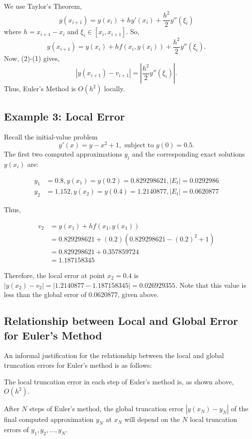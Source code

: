 \documentclass [titlepage,12pt,letter] {article}
\begin{document}
We use Taylor's Theorem,
\[
y(x_{i+1})=y(x_i)+hy'(x_i)+\frac{h^2}{2}y''(\xi_i)
\]
where $h=x_{i+1}-x_i$ and $\xi_i \in [x_i,x_{i+1}]$. So,
\begin{equation}
y(x_{i+1})=y(x_i)+hf(x_i,y(x_i))+\frac{h^2}{2}y''(\xi_i).
\end{equation}
Now, (2)-(1) gives,
\[
|y(x_{i+1})-v_{i+1}|=\left |\frac{h^2}{2}y''(\xi_i) \right |.
\]
Thus, Euler's Method is $O(h^2)$ locally.

\subsection{Example 3: Local Error}

Recall the initial-value problem
\[
y'(x)=y-x^2+1, \text{ subject to } y(0)=0.5.
\]
The first two computed approximations $y_i$ and the corresponding exact solutions $y(x_i)$ are:

\begin{align*}
y_1&=0.8, y(x_1)=y(0.2)=0.829298621, |E_t|=0.0292986 \\
y_2&=1.152, y(x_2)=y(0.4)=1.2140877, |E_t|=0.0620877
\end{align*}

Thus,

\begin{align*}
v_2&=y(x_1)+hf(x_1,y(x_1)) \\
&=0.829298621+(0.2)(0.829298621-(0.2)^2+1) \\
&=0.829298621+0.357859724 \\
&=1.187158345
\end{align*}

Therefore, the local error at point $x_2=0.4$ is $|y(x_2)-v_2|=|1.2140877-1.187158345|=0.026929355$. Note that this value is less than the global error of 0.0620877, given above.

\subsection{Relationship between Local and Global Error for Euler's Method}

An informal justification for the relationship between the local and global truncation errors for Euler's method is as follows:

The local truncation error in each step of Euler's method is, as shown above, $O(h^2)$.

After $N$ steps of Euler's method, the global truncation error $|y(x_N)-y_N|$ of the final computed approximation $y_N$ at $x_N$ will depend on the $N$ local truncation errors of $y_1,y_2,...,y_N$.
\end{document}
